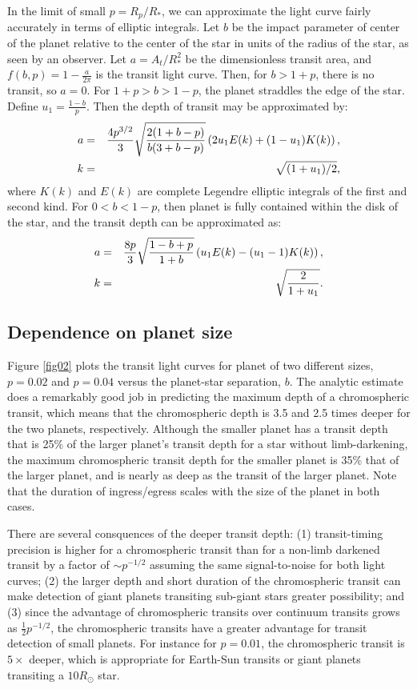 \documentclass[manuscript]{aastex}
\begin{document}
In the limit of small $p=R_p/R_*$, we can approximate the light curve
fairly accurately in terms of elliptic integrals.
Let $b$ be the impact parameter of center of the planet relative to
the center of the star in units of the radius of the star, as
seen by an observer.  Let $a = A_t/R_*^2$ be the dimensionless transit 
area, and $f(b,p)=1-\frac{a}{2\pi}$ is the transit light curve.
Then, for $b > 1+p$, there is no transit, so $a=0$.
For $1+p > b > 1-p$, the planet straddles the edge of the star.
Define $u_1=\frac{1-b}{p}$.
Then the depth of transit may be approximated by:
\begin{eqnarray}\label{ingress}
a&=&\frac{4p^{3/2}}{3}\sqrt{2(1+b-p)\over b(3+b-p)}\left(2u_1 E(k)+(1-u_1)K(k)\right), \cr
k &=&\sqrt{(1+u_1)/2},
\end{eqnarray}
where $K(k)$ and $E(k)$ are complete Legendre elliptic integrals of the first and
second kind.
For $0 < b < 1-p$, then planet is fully contained within the disk of the star,
and the transit depth can be approximated as:
\begin{eqnarray}\label{disk}
a&=&{8p\over 3}\sqrt{1-b+p\over 1+b}\left(u_1E(k)-(u_1-1)K(k)\right),\cr
k&=&\sqrt{2\over 1+u_1}.
\end{eqnarray}

\subsection{Dependence on planet size}

Figure \ref{fig02} plots the transit light curves for planet of
two different sizes, $p=0.02$ and $p=0.04$ versus the planet-star
separation, $b$.  The analytic estimate does a remarkably good
job in predicting the maximum depth of a chromospheric transit,
which means that the chromospheric depth is 3.5 and 2.5 times
deeper for the two planets, respectively.  Although the smaller
planet has a transit depth that is 25\% of the larger planet's
transit depth for a star without limb-darkening, the maximum 
chromospheric transit depth for the smaller planet is 35\% that 
of the larger planet, and is nearly as deep as the transit of 
the larger planet.  Note that the duration of ingress/egress 
scales with the size of the planet in both cases.  

There are several consquences of the deeper transit depth:
(1) transit-timing precision is higher for a chromospheric
transit than for a non-limb darkened transit by a factor of
$\sim p^{-1/2}$ assuming the same signal-to-noise for
both light curves; (2) the larger depth and short duration
of the chromospheric transit can make detection of giant
planets transiting sub-giant stars greater possibility;
and (3) since the advantage of chromospheric transits
over continuum transits grows as $\frac{1}{2}p^{-1/2}$,
the chromospheric transits have a greater advantage for
transit detection of small planets. For instance
for $p=0.01$, the chromospheric transit is $5\times$
deeper, which is appropriate for Earth-Sun transits
or giant planets transiting a $10R_\odot$ star.
\end{document}
